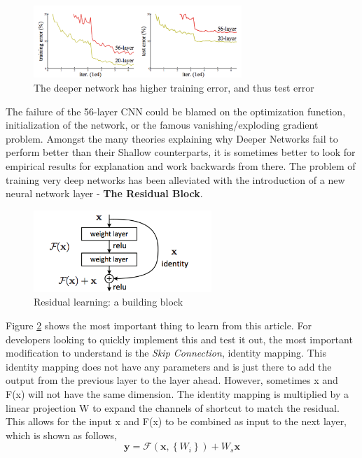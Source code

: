 \documentclass[12pt]{article}
\begin{document}
\begin{figure}[ht!]
\centering
\includegraphics[width=0.7\textwidth]{threshold.png}
\caption{The deeper network has higher training error, and thus test error}
\label{threshold}
\end{figure}
\par The failure of the 56-layer CNN could be blamed on the optimization function, initialization of the network, or the famous vanishing/exploding gradient problem. Amongst the many theories explaining why Deeper Networks fail to perform better than their Shallow counterparts, it is sometimes better to look for empirical results for explanation and work backwards from there. The problem of training very deep networks has been alleviated with the introduction of a new neural network layer - \textbf{The Residual Block}\cite{he2016deep}.
\begin{figure}[H]
\centering
\includegraphics[width=0.6\textwidth]{resnet.png}
\caption{Residual learning: a building block}
\label{resnet}
\end{figure}
\par Figure \ref{resnet} shows the most important thing to learn from this article. For developers looking to quickly implement this and test it out, the most important modification to understand is the \textit{Skip Connection}, identity mapping. This identity mapping does not have any parameters and is just there to add the output from the previous layer to the layer ahead. However, sometimes x and F(x) will not have the same dimension. The identity mapping is multiplied by a linear projection W to expand the channels of shortcut to match the residual. This allows for the input x and F(x) to be combined as input to the next layer, which is shown as follows,
$$
\mathbf{y}=\mathcal{F}\left(\mathbf{x},\left\{W_{i}\right\}\right)+W_{s} \mathbf{x}
$$
\end{document}
